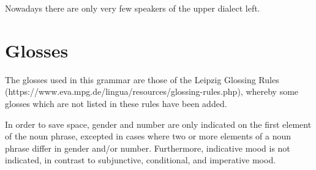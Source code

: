 Nowadays there are only very few speakers of the upper dialect left.


\section{Glosses}
The glosses used in this grammar are those of the Leipzig Glossing Rules (https://www.eva.mpg.de/lingua/resources/glossing-rules.php), whereby some glosses which are not listed in these rules have been added.

In order to save space, gender and number are only indicated on the first element of the noun phrase, excepted in cases where two or more elements of a noun phrase differ in gender and/or number. Furthermore, indicative mood is not indicated, in contrast to subjunctive, conditional, and imperative mood.





